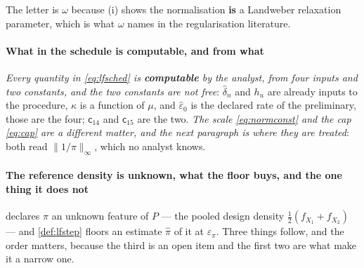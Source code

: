 The letter is $\omega$ because (i) shows the normalisation \textbf{is} a
Landweber relaxation parameter, which is what $\omega$ names in the regularisation literature.

\paragraph{What in the schedule is computable, and from what}

\emph{Every quantity in \eqref{eq:lfsched} is \textbf{computable} by the analyst, from four inputs and
two constants, and the two constants are not free}: $\hat\delta_n$ and $h_u$ are already inputs to the
procedure, $\kappa$ is a function of $\mu$, and $\hat\varepsilon_0$ is the declared rate of the
preliminary, those are the four; $\mathsf c_{14}$ and $\mathsf c_{15}$ are the two.
\emph{The scale \eqref{eq:normconst} and the cap \eqref{eq:cap} are a different matter, and the next
paragraph is where they are treated}: both read $\|1/\pi\|_\infty$, which no analyst knows.

\paragraph{The reference density is unknown, what the floor buys, and the one thing it does not}

 declares $\pi$ an unknown feature of $P$ --- the pooled design density
$\tfrac12(f_{X_1}+f_{X_2})$ --- and \cref{def:lfstep} floors an estimate $\hat\pi$ of it at
$\varepsilon_\pi$. Three things follow, and the order matters, because the third is an open item and the
first two are what make it a narrow one.

